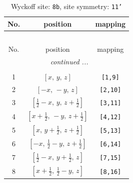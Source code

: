 \documentclass[fleqn,8pt]{jsarticle}
\begin{document}
\begin{longtable}{ccc}
\caption{Wyckoff site: {\tt 8b}, site symmetry: {\tt 11'}}
 \\
 \hline \hline
No. & position & mapping \\ \hline \endfirsthead

\multicolumn{2}{l}{\tablename\ \thetable{}} \\
 \hline \hline
No. & position & mapping \\ \hline \endhead

 \hline \hline
\multicolumn{2}{r}{\footnotesize\it continued ...} \\ \endfoot

 \hline \hline
\multicolumn{2}{r}{} \\ \endlastfoot

1 & $\left[ x,\, y,\, z \right]$ & {\tt [1,9]} \\ \hline
2 & $\left[ - x,\, - y,\, z \right]$ & {\tt [2,10]} \\ \hline
3 & $\left[ \frac{1}{2} - x,\, y,\, z + \frac{1}{2} \right]$ & {\tt [3,11]} \\ \hline
4 & $\left[ x + \frac{1}{2},\, - y,\, z + \frac{1}{2} \right]$ & {\tt [4,12]} \\ \hline
5 & $\left[ x,\, y + \frac{1}{2},\, z + \frac{1}{2} \right]$ & {\tt [5,13]} \\ \hline
6 & $\left[ - x,\, \frac{1}{2} - y,\, z + \frac{1}{2} \right]$ & {\tt [6,14]} \\ \hline
7 & $\left[ \frac{1}{2} - x,\, y + \frac{1}{2},\, z \right]$ & {\tt [7,15]} \\ \hline
8 & $\left[ x + \frac{1}{2},\, \frac{1}{2} - y,\, z \right]$ & {\tt [8,16]} \\
\end{longtable}
\end{document}

